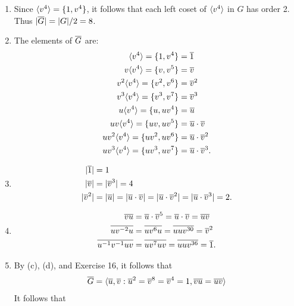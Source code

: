 \begin{enumerate}
      \begin{enumerate}
         \item Since $\langle v^4 \rangle = \{1, v^4\}$, it follows that each left coset
               of $\langle v^4 \rangle$ in $G$ has order 2. Thus $|\overline{G}| = |G|/2 = 8$.
         \item The elements of $\overline{G}$ are:
               \begin{align*}
                  \langle v^4 \rangle = \{1, v^4\} &= \overline{1} \\
                  v\langle v^4 \rangle = \{v, v^5\} &= \overline{v} \\
                  v^2\langle v^4 \rangle = \{v^2, v^6\} &= \overline{v}^2 \\
                  v^3\langle v^4 \rangle =\{v^3, v^7\} &= \overline{v}^3 \\
                  u\langle v^4 \rangle = \{u, uv^4\} &= \overline{u} \\
                  uv\langle v^4 \rangle = \{uv, uv^5\} &= \overline{u} \cdot \overline{v} \\
                  uv^2\langle v^4 \rangle = \{uv^2, uv^6\} &= \overline{u} \cdot \overline{v}^2 \\
                  uv^3\langle v^4 \rangle = \{uv^3, uv^7\} &= \overline{u} \cdot \overline{v}^3.
               \end{align*}
         \item \begin{align*}
                  |\overline{1}| &= 1 \\
                  |\overline{v}| &= |\overline{v}^3| = 4 \\
                  |\overline{v}^2|&= |\overline{u}| = |\overline{u} \cdot \overline{v}| =
                  |\overline{u} \cdot \overline{v}^2| = |\overline{u} \cdot \overline{v}^3| = 2.
               \end{align*}
         \item \begin{align*}
                  \overline{vu} &= \overline{u} \cdot \overline{v}^5 = \overline{u} \cdot \overline{v} = \overline{uv} \\
                  \overline{uv^{-2}u} &= \overline{uv^6u} = \overline{uuv^{30}} = \overline{v}^2\\
                  \overline{u^{-1}v^{-1}uv} &= \overline{uv^7uv} = \overline{uuv^{36}} = \overline{1}.
               \end{align*}
         \item By (c), (d), and Exercise 16, it follows that
               \begin{align*}
                  \overline{G} = \langle \overline{u}, \overline{v} : \overline{u}^2 = \overline{v}^8 = \overline{v}^4 = 1,
                     \overline{vu} = \overline{uv} \rangle
               \end{align*}
               It follows that

\end{enumerate}
\end{enumerate}
